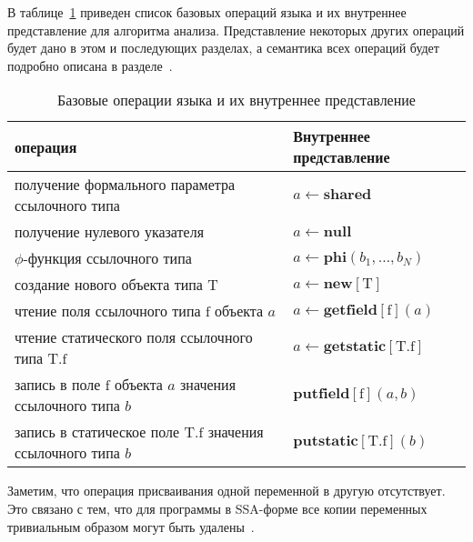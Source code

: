 \documentclass[14pt,titlepage,draft]{extarticle}
\newcommand{\java}{\eng{Java}\xspace}
\let\mathphi\phi
\renewcommand{\phi}{\ensuremath{\mathphi}}
\newcommand{\type}[1]{\mathrm{#1}}
\newcommand{\field}[1]{\mathrm{#1}}
\newcommand{\sfield}[2]{\type{#1}.\field{#2}}
\newcommand{\op}[1]{\mathbf{#1}}
\begin{document}
    В таблице~\ref{tabular:basic_operations} приведен список базовых операций
    языка \java и их внутреннее представление для алгоритма анализа.
    Представление некоторых других операций будет дано в этом и последующих
    разделах, а семантика всех операций будет подробно описана в
    разделе~\todoref.

    \begin{table}[htb]
      \centering

      \begin{tabular}{|p{}|p{}|}\hline
        \textbf{\java операция} &
          \textbf{Внутреннее представление}\\ \hline

        получение формального параметра ссылочного типа
        & $a \gets \op{shared}$
        \\ \hline

        получение нулевого указателя
        & $a \gets \op{null}$
        \\ \hline

        \phi-функция ссылочного типа
        & $a \gets \op{phi}(b_1, \ldots, b_N)$
        \\ \hline

        создание нового объекта типа $\type{T}$
        & $a \gets \op{new}[\type{T}]$
        \\ \hline

        чтение поля ссылочного типа $\field{f}$ объекта $a$
        & $a \gets \op{getfield}[\field{f}](a)$
        \\ \hline

        чтение статического поля ссылочного типа $\sfield{T}{f}$
        & $a \gets \op{getstatic}[\sfield{T}{f}]$
        \\ \hline

        запись в поле $\field{f}$ объекта $a$ значения ссылочного типа $b$
        & $\op{putfield}[\field{f}](a, b)$
        \\ \hline

        запись в статическое поле $\sfield{T}{f}$ значения ссылочного типа $b$
        & $\op{putstatic}[\sfield{T}{f}](b)$
        \\ \hline

      \end{tabular}
      \caption{Базовые операции языка \java и их внутреннее представление}
      \label{tabular:basic_operations}
    \end{table}

    Заметим, что операция присваивания одной переменной в другую отсутствует.
    Это связано с тем, что для программы в SSA-форме все копии переменных
    тривиальным образом могут быть удалены~\cite{ssa}.
\end{document}
